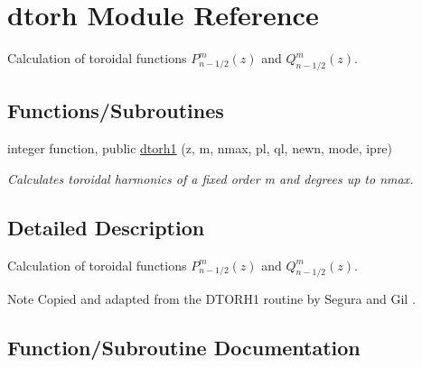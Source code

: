 \hypertarget{namespacedtorh}{}\section{dtorh Module Reference}
\label{namespacedtorh}


Calculation of toroidal functions $P_{n-1/2}^m \left(z\right)$ and $Q_{n-1/2}^m \left(z\right)$.  


\subsection*{Functions/\+Subroutines}
\begin{DoxyCompactItemize}
\item 
integer function, public \hyperlink{namespacedtorh_af3f58b6705da916bfbaf7cc4ea05f610}{dtorh1} (z, m, nmax, pl, ql, newn, mode, ipre)
\begin{DoxyCompactList}\small\item\em Calculates toroidal harmonics of a fixed order {\ttfamily m} and degrees up to {\ttfamily nmax}. \end{DoxyCompactList}\end{DoxyCompactItemize}


\subsection{Detailed Description}
Calculation of toroidal functions $P_{n-1/2}^m \left(z\right)$ and $Q_{n-1/2}^m \left(z\right)$. 

\begin{DoxyNote}{Note}
Copied and adapted from the D\+T\+O\+R\+H1 routine by Segura and Gil \cite{Segura2000} . 
\end{DoxyNote}


\subsection{Function/\+Subroutine Documentation}
\mbox{\label{namespacedtorh_af3f58b6705da916bfbaf7cc4ea05f610}} 
